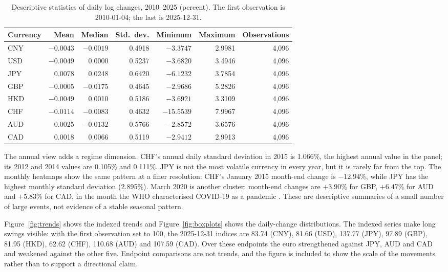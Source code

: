 \documentclass[journal]{IEEEtran}
\begin{document}
\begin{table}[t]
\caption{Descriptive statistics of daily log changes, 2010--2025 (percent). The first observation is 2010-01-04; the last is 2025-12-31.}
\label{tab:descriptive}
\centering
\small
\renewcommand{\arraystretch}{1.15}
\begin{tabular}{lrrrrrr}
\toprule
Currency & Mean & Median & Std.\ dev. & Minimum & Maximum & Observations \\
\midrule
CNY & $-0.0043$ & $-0.0019$ & 0.4918 & $-3.3747$ & 2.9981 & 4,096 \\
USD & $-0.0049$ & 0.0000 & 0.5237 & $-3.6820$ & 3.4946 & 4,096 \\
JPY & 0.0078 & 0.0248 & 0.6420 & $-6.1232$ & 3.7854 & 4,096 \\
GBP & $-0.0005$ & $-0.0175$ & 0.4645 & $-2.9686$ & 5.2826 & 4,096 \\
HKD & $-0.0049$ & 0.0010 & 0.5186 & $-3.6921$ & 3.3109 & 4,096 \\
CHF & $-0.0114$ & $-0.0083$ & 0.4632 & $-15.5539$ & 7.9967 & 4,096 \\
AUD & 0.0025 & $-0.0132$ & 0.5766 & $-2.8572$ & 3.6576 & 4,096 \\
CAD & 0.0018 & 0.0066 & 0.5119 & $-2.9412$ & 2.9913 & 4,096 \\
\bottomrule
\end{tabular}
\end{table}

The annual view adds a regime dimension. CHF's annual daily standard deviation in 2015 is 1.066\%, the highest annual value in the panel; its 2012 and 2014 values are 0.105\% and 0.111\%. JPY is not the most volatile currency in every year, but it is rarely far from the top. The monthly heatmaps show the same pattern at a finer resolution: CHF's January 2015 month-end change is $-12.94\%$, while JPY has the highest monthly standard deviation (2.895\%). March 2020 is another cluster: month-end changes are $+3.90\%$ for GBP, $+6.47\%$ for AUD and $+5.83\%$ for CAD, in the month the WHO characterised COVID-19 as a pandemic \cite{who2020}. These are descriptive summaries of a small number of large events, not evidence of a stable seasonal pattern.

Figure~\ref{fig:trends} shows the indexed trends and Figure~\ref{fig:boxplots} shows the daily-change distributions. The indexed series make long swings visible: with the first observation set to 100, the 2025-12-31 indices are 83.74 (CNY), 81.66 (USD), 137.77 (JPY), 97.89 (GBP), 81.95 (HKD), 62.62 (CHF), 110.68 (AUD) and 107.59 (CAD). Over these endpoints the euro strengthened against JPY, AUD and CAD and weakened against the other five. Endpoint comparisons are not trends, and the figure is included to show the scale of the movements rather than to support a directional claim.
\end{document}
